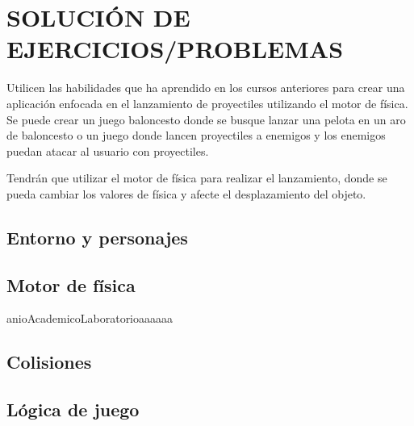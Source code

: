 \section{SOLUCIÓN DE EJERCICIOS/PROBLEMAS}

Utilicen las habilidades que ha aprendido en los cursos anteriores para crear una aplicación enfocada en el lanzamiento de proyectiles utilizando el motor de física. Se puede crear un juego baloncesto donde se busque lanzar una pelota en un aro de baloncesto o un juego donde lancen proyectiles a enemigos y los enemigos puedan atacar al usuario con proyectiles. 

Tendrán que utilizar el motor de física para realizar el lanzamiento, donde se pueda cambiar los valores de física y afecte el desplazamiento del objeto.

\subsection{Entorno y personajes}

\subsection{Motor de física}
anioAcademicoLaboratorioaaaaaa

\subsection{Colisiones}

\subsection{Lógica de juego}


